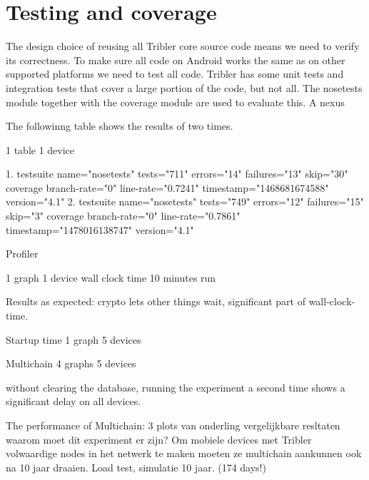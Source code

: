 \section{Testing and coverage}
The design choice of reusing all Tribler core source code means we need to verify its correctness.
To make sure all code on Android works the same as on other supported platforms we need to test all code.
Tribler has some unit tests and integration tests that cover a large portion of the code, but not all.
The nosetests module together with the coverage module are used to evaluate this.
A nexus 

The followinng table shows the results of two times.

1 table
1 device

1.
testsuite name="nosetests" tests="711" errors="14" failures="13" skip="30"
coverage branch-rate="0" line-rate="0.7241" timestamp="1468681674588" version="4.1"
2.
testsuite name="nosetests" tests="749" errors="12" failures="15" skip="3"
coverage branch-rate="0" line-rate="0.7861" timestamp="1478016138747" version="4.1"








Profiler

1 graph
1 device
wall clock time
10 minutes run

Results as expected: crypto lets other things wait, significant part of wall-clock-time.



Startup time
1 graph
5 devices


Multichain
4 graphs
5 devices

without clearing the database, running the experiment a second time shows a significant delay on all devices.

The performance of Multichain:
3 plots van onderling vergelijkbare resltaten
waarom moet dit experiment er zijn?
Om mobiele devices met Tribler volwaardige nodes in het netwerk te maken moeten ze multichain aankunnen ook na 10 jaar draaien.
Load test, simulatie 10 jaar. (174 days!)
